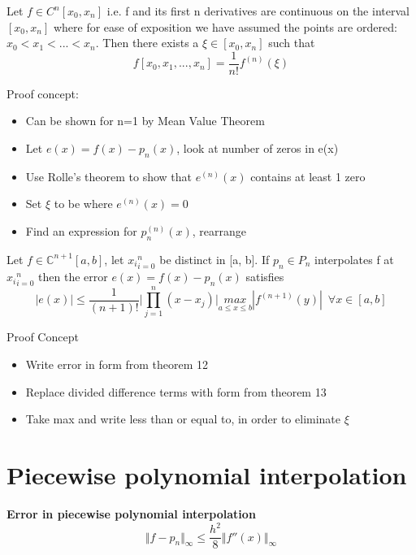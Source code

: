 \documentclass{article}
\begin{document}
\begin{theorem}
Let $f \in C^n[x_0, x_n]$ i.e. f and its first n derivatives are continuous on the interval $[x_0, x_n]$ where for ease of exposition we have assumed the points are ordered: $x_0 < x_1 < ... < x_n$. Then there exists a $\xi \in [x_0,x_n]$ such that
$$f[x_0,x_1,... ,x_n] = \frac{1}{n!} f^{(n)}(\xi) $$
\end{theorem}
Proof concept:
\begin{itemize}
    \item Can be shown for n=1 by Mean Value Theorem
    \item Let $e(x) = f(x) - p_n(x)$, look at number of zeros in e(x)
    \item Use Rolle's theorem to show that $e^{(n)}(x)$ contains at least 1 zero
    \item Set $\xi$ to be where $e^{(n)}(x) = 0$
    \item Find an expression for $p_n^{(n)}(x)$, rearrange 
\end{itemize}
\begin{theorem}
Let $f \in \mathbb{C}^{n+1}[a, b]$, let ${x_i}^n_{i=0}$ be distinct in [a, b]. If $p_n \in P_n$ interpolates f at ${x_i}^n_{i=0}$ then the error $e(x) = f(x) - p_n(x)$ satisfies
$$|e(x)| \leq \frac{1}{(n+1)!} \bigg | \prod_{j=1}^n (x - x_j) \bigg | \underset{a \leq x \leq b}{max} |f^{(n+1)}(y)| \hspace{6pt} \forall x \in [a,b]
$$
\end{theorem}
Proof Concept
\begin{itemize}
    \item Write error in form from theorem 12
    \item Replace divided difference terms with form from theorem 13
    \item Take max and write less than or equal to, in order to eliminate $\xi$
\end{itemize}
\section{Piecewise polynomial interpolation}
\begin{theorem} \textbf{Error in piecewise polynomial interpolation}
$$
\Vert f - p_n \Vert_\infty \leq \frac{h^2}{8} \Vert f''(x) \Vert_\infty
$$
\end{theorem}
\end{document}
